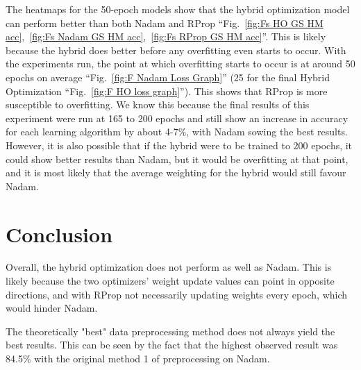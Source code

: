 \documentclass[conference]{IEEEtran}
\begin{document}
The heatmaps for the 50-epoch models show that the hybrid optimization model can perform better than both Nadam and RProp ``Fig.~\ref{fig:Fs HO GS HM acc},~\ref{fig:Fs Nadam GS HM acc},~\ref{fig:Fs RProp GS HM acc}''. This is likely because the hybrid does better before any overfitting even starts to occur. With the experiments run, the point at which overfitting starts to occur is at around 50 epochs on average ``Fig.~\ref{fig:F Nadam Loss Graph}'' (25 for the final Hybrid Optimization ``Fig.~\ref{fig:F HO loss graph}''). This shows that RProp is more susceptible to overfitting. We know this because the final results of this experiment were run at 165 to 200 epochs and still show an increase in accuracy for each learning algorithm by about 4-7\%, with Nadam sowing the best results. However, it is also possible that if the hybrid were to be trained to 200 epochs, it could show better results than Nadam, but it would be overfitting at that point, and it is most likely that the average weighting for the hybrid would still favour Nadam.

\section{Conclusion}

Overall, the hybrid optimization does not perform as well as Nadam. This is likely because the two optimizers' weight update values can point in opposite directions, and with RProp not necessarily updating weights every epoch, which would hinder Nadam.

The theoretically "best" data preprocessing method does not always yield the best results. This can be seen by the fact that the highest observed result was 84.5\% with the original method 1 of preprocessing on Nadam.

\newpage
\end{document}
